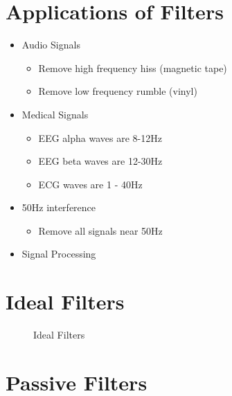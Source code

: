 \documentclass[oneside]{book}
\begin{document}
            \section{Applications of Filters}
                \begin{itemize}
                    \item Audio Signals
                    \begin{itemize}
                        \item Remove high frequency hiss (magnetic tape)
                        \item Remove low frequency rumble (vinyl)
                    \end{itemize}
                    \item Medical Signals
                    \begin{itemize}
                        \item EEG alpha waves are 8-12Hz
                        \item EEG beta waves are 12-30Hz
                        \item ECG waves are 1 - 40Hz
                    \end{itemize}
                    \item 50Hz interference
                    \begin{itemize}
                        \item Remove all signals near 50Hz
                    \end{itemize}
                    \item Signal Processing
                \end{itemize}
            \section{Ideal Filters}
                \begin{figure}[H]
                    \centering
                    
                    \caption{Ideal Filters}
                \end{figure}
            \section{Passive Filters}
\end{document}
